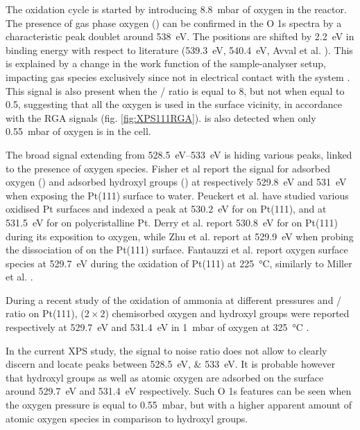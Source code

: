 The oxidation cycle is started by introducing \qty{8.8}{\milli\bar} of oxygen in the reactor.
The presence of gas phase oxygen () can be confirmed in the O 1s spectra by a characteristic peak doublet around \qty{538}{\eV}.
The positions are shifted by \qty{2.2}{\eV} in binding energy with respect to literature (\qty{539.3}{\eV}, \qty{540.4}{\eV}, Avval et al. \cite*{Avval2022}).
This is explained by a change in the work function of the sample-analyser setup, impacting gas species exclusively since not in electrical contact with the system \parencite{Starr2021}.
This signal is also present when the / ratio is equal to 8, but not when equal to 0.5, suggesting that all the oxygen is used in the surface vicinity, in accordance with the RGA signals (fig. \ref{fig:XPS111RGA}).
 is also detected when only \qty{0.55}{\milli\bar} of oxygen is in the cell.

The broad signal extending from \qtyrange{528.5}{533}{\eV} is hiding various peaks, linked to the presence of oxygen species.
Fisher et al \parencite*{Fisher1980} report the signal for adsorbed oxygen () and adsorbed hydroxyl groups () at respectively \qty{529.8}{\eV} and \qty{531}{\eV} when exposing the Pt(111) surface to water.
Peuckert et al. \parencite*{Peuckert1984} have studied various oxidised Pt surfaces and indexed a peak at \qty{530.2}{\eV} for  on Pt(111), and at \qty{531.5}{\eV} for  on polycristalline Pt.
Derry et al. \parencite*{Derry1984} report \qty{530.8}{\eV} for  on Pt(111) during its exposition to oxygen, while Zhu et al. \parencite*{Zhu2003} report  at \qty{529.9}{\eV} when probing the dissociation of  on the Pt(111) surface.
Fantauzzi et al. \parencite*{Fantauzzi2017} report oxygen surface species at \qty{529.7}{\eV} during the oxidation of Pt(111) at \qty{225}{\degreeCelsius}, similarly to Miller et al. \parencite*{Miller2014}.

During a recent study of the oxidation of ammonia at different pressures and / ratio on Pt(111), ($2\times2$) chemisorbed oxygen and hydroxyl groups were reported respectively at \qty{529.7}{\eV} and \qty{531.4}{\eV} in \qty{1}{\milli\bar} of oxygen at \qty{325}{\degreeCelsius} \parencite{Ivashenko2021}.

In the current XPS study, the signal to noise ratio does not allow to clearly discern and locate peaks between \qtylist{528.5;533}{\eV}.
It is probable however that hydroxyl groups as well as atomic oxygen are adsorbed on the surface around \qty{529.7}{\eV} and \qty{531.4}{\eV} respectively.
Such O 1s features can be seen when the oxygen pressure is equal to \qty{0.55}{\milli\bar}, but with a higher apparent amount of atomic oxygen species in comparison to hydroxyl groups.

